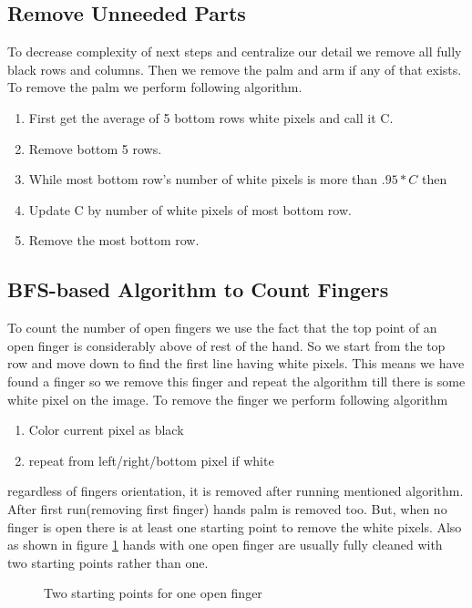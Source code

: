 \subsection{Remove Unneeded Parts}
To decrease complexity of next steps and centralize our detail we remove all fully black rows and columns. Then we remove the palm and arm if any of that exists. To remove the palm we perform following algorithm.
\begin{enumerate}
\item{First get the average of 5 bottom rows white pixels and call it C.}
\item{Remove bottom 5 rows.}
\item{While most bottom row's number of white pixels is more than $.95 * C$ then }
\item{Update C by number of white pixels of most bottom row.}
\item{Remove the most bottom row.}
\end{enumerate} 

\subsection{BFS-based Algorithm to Count Fingers}
To count the number of open fingers we use the fact that the top point of an open finger is considerably above of rest of the hand. So we start from the top row and move down to find the first line having white pixels. This means we have found a finger so we remove this finger and repeat the algorithm till there is some white pixel on the image. To remove the finger we perform following algorithm 
\begin{enumerate}
	\item{Color current pixel as black}
	\item{repeat from left/right/bottom pixel if white}
\end{enumerate}
regardless of fingers orientation, it is removed after running mentioned algorithm. After first run(removing first finger) hands palm is removed too. But, when no finger is open there is at least one starting point to remove the white pixels. Also as shown in figure \ref{fig:twostarts} hands with one open finger are usually fully cleaned with two starting points rather than one. 
\begin{center}
\begin{figure}
\caption{Two starting points for one open finger}
\label{fig:twostarts}
\end{figure}
\end{center}

